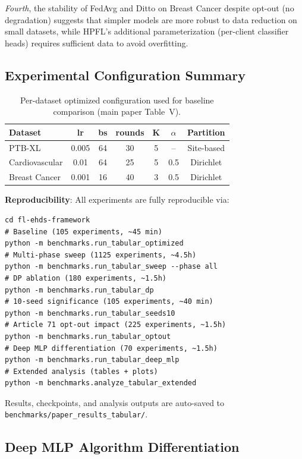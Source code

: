 \documentclass[conference]{IEEEtran}
\begin{document}
\textit{Fourth}, the stability of FedAvg and Ditto on Breast Cancer despite opt-out (no degradation) suggests that simpler models are more robust to data reduction on small datasets, while HPFL's additional parameterization (per-client classifier heads) requires sufficient data to avoid overfitting.

\subsection{Experimental Configuration Summary}

\begin{table}[t]
\centering
\caption{Per-dataset optimized configuration used for baseline comparison (main paper Table~V).}
\label{tab:dataset_config}
\small
\begin{tabular}{lcccccc}
\toprule
\textbf{Dataset} & \textbf{lr} & \textbf{bs} & \textbf{rounds} & \textbf{K} & \textbf{$\alpha$} & \textbf{Partition} \\
\midrule
PTB-XL & 0.005 & 64 & 30 & 5 & -- & Site-based \\
Cardiovascular & 0.01 & 64 & 25 & 5 & 0.5 & Dirichlet \\
Breast Cancer & 0.001 & 16 & 40 & 3 & 0.5 & Dirichlet \\
\bottomrule
\end{tabular}
\end{table}

\textbf{Reproducibility}: All experiments are fully reproducible via:
\begin{verbatim}
cd fl-ehds-framework
# Baseline (105 experiments, ~45 min)
python -m benchmarks.run_tabular_optimized
# Multi-phase sweep (1125 experiments, ~4.5h)
python -m benchmarks.run_tabular_sweep --phase all
# DP ablation (180 experiments, ~1.5h)
python -m benchmarks.run_tabular_dp
# 10-seed significance (105 experiments, ~40 min)
python -m benchmarks.run_tabular_seeds10
# Article 71 opt-out impact (225 experiments, ~1.5h)
python -m benchmarks.run_tabular_optout
# Deep MLP differentiation (70 experiments, ~1.5h)
python -m benchmarks.run_tabular_deep_mlp
# Extended analysis (tables + plots)
python -m benchmarks.analyze_tabular_extended
\end{verbatim}

Results, checkpoints, and analysis outputs are auto-saved to \texttt{benchmarks/paper\_results\_tabular/}.

\subsection{Deep MLP Algorithm Differentiation}
\label{sec:deep_mlp}
\end{document}

